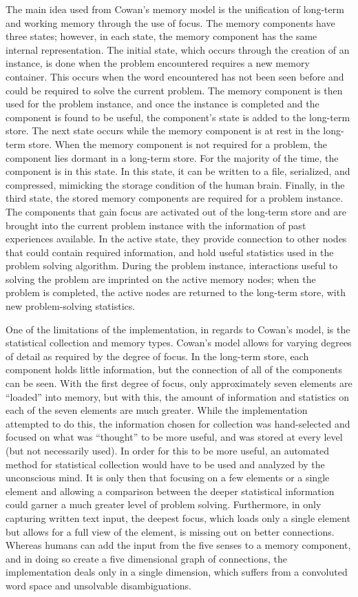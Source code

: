 The main idea used from Cowan's memory model is the unification of long-term and
working memory through the use of focus.  The memory components have three
states; however, in each state, the memory component has the same internal
representation. The initial state, which occurs through the creation of an
instance, is done when the problem encountered requires a new memory container.
This occurs when the word encountered has not been seen before and could be
required to solve the current problem. The memory component is then used for the
problem instance, and once the instance is completed and the component is found
to be useful, the component's state is added to the long-term store. The next
state occurs while the memory component is at rest in the long-term store. When
the memory component is not required for a problem, the component lies dormant
in a long-term store. For the majority of the time, the component is in this
state.  In this state, it can be written to a file, serialized, and
compressed, mimicking the storage condition of the human brain. Finally, in the
third state, the stored memory components are required for a problem instance.
The components that gain focus are activated out of the long-term store and are
brought into the current problem instance with the information of past
experiences available. In the active state, they provide connection to other
nodes that could contain required information, and hold useful statistics used
in the problem solving algorithm.  During the problem instance, interactions
useful to solving the problem are imprinted on the active memory nodes; 
when the problem is completed, the active nodes are returned to the long-term
store, with new problem-solving statistics.

One of the limitations of the implementation, in regards to Cowan's model, is the
statistical collection and memory types.  Cowan's model allows for varying
degrees of detail as required by the degree of focus.  In the long-term store,
each component holds little information, but the connection of all of the
components can be seen.  With the first degree of focus, only approximately
seven elements are ``loaded'' into memory, but with this, the amount of
information and statistics on each of the seven elements are much greater.
While the implementation attempted to do this, the information chosen for
collection was hand-selected and focused on what was ``thought'' to be more
useful, and was stored at every level (but not necessarily used).  In order for
this to be more useful, an automated method for statistical collection would have
to be used and analyzed by the unconscious mind.  It is only then that focusing
on a few elements or a single element and allowing a comparison between the
deeper statistical information could garner a much greater level of problem
solving. Furthermore, in only capturing written text input, the deepest focus,
which loads only a single element but allows for a full view of the element, is
missing out on better connections.  Whereas humans can add the input from the
five senses to a memory component, and in doing so create a five dimensional
graph of connections, the implementation deals only in a single dimension, which
suffers from a convoluted word space and unsolvable disambiguations.

